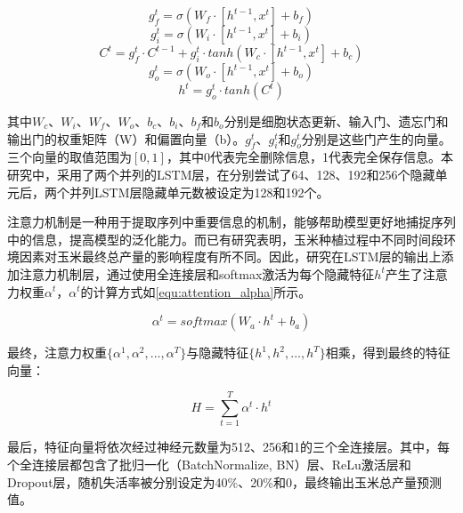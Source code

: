 \begin{equation}
  \label{equ:lstm1}
  g_f^t=\sigma (W_f\cdot [h^{t-1}, x^t]+b_f)
\end{equation}
\begin{equation}
  \label{equ:lstm2}
  g_i^t=\sigma (W_i\cdot [h^{t-1}, x^t]+b_i)
\end{equation}
\begin{equation}
  \label{equ:lstm3}
  C^t=g_f^t\cdot C^{t-1}+g_i^t\cdot tanh(W_c\cdot [h^{t-1}, x^t]+b_c)
\end{equation}
\begin{equation}
  \label{equ:lstm4}
  g_o^t=\sigma (W_o\cdot [h^{t-1}, x^t]+b_o)
\end{equation}
\begin{equation}
  \label{equ:lstm5}
  h^t=g_o^t\cdot tanh(C^t)
\end{equation}

\par 其中$W_c$、$W_i$、$W_f$、$W_o$、$b_c$、$b_i$、$b_f$和$b_o$分别是细胞状态更新、输入门、遗忘门和输出门的权重矩阵（W）和偏置向量（b）。$g_f^t$、$g_i^t$和$g_o^t$分别是这些门产生的向量。三个向量的取值范围为$[0,1]$，其中0代表完全删除信息，1代表完全保存信息。本研究中，采用了两个并列的LSTM层，在分别尝试了64、128、192和256个隐藏单元后，两个并列LSTM层隐藏单元数被设定为128和192个。

\par 注意力机制是一种用于提取序列中重要信息的机制，能够帮助模型更好地捕捉序列中的信息，提高模型的泛化能力。而已有研究表明，玉米种植过程中不同时间段环境因素对玉米最终总产量的影响程度有所不同\cite{shook2021crop}。因此，研究在LSTM层的输出上添加注意力机制层，通过使用全连接层和softmax激活为每个隐藏特征$h^t$产生了注意力权重$\alpha ^t$，$\alpha ^t$的计算方式如\autoref{equ:attention_alpha}所示。

\begin{equation}
  \label{equ:attention_alpha}
  \alpha ^t=softmax (W_a\cdot h^t+b_a)
\end{equation}

\par 最终，注意力权重$\{\alpha ^1,\alpha ^2,..., \alpha ^T \}$与隐藏特征$\{h ^1,h ^2,..., h ^T \}$相乘，得到最终的特征向量：

\begin{equation}
  \label{equ:attention}
  H=\sum_{t=1}^T \alpha ^t\cdot h^t
\end{equation}

\par 最后，特征向量将依次经过神经元数量为512、256和1的三个全连接层。其中，每个全连接层都包含了批归一化（BatchNormalize, BN）层、ReLu激活层和Dropout层，随机失活率被分别设定为40\%、20\%和0，最终输出玉米总产量预测值。

